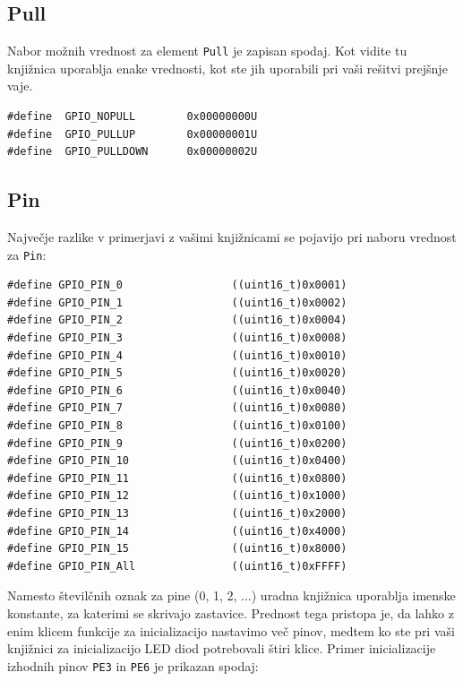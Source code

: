 \documentclass[12pt,letterpaper]{article}
\begin{document}
\subsection*{Pull}

Nabor možnih vrednost za element \texttt{Pull} je zapisan spodaj. Kot vidite tu knjižnica uporablja enake vrednosti, kot ste jih uporabili pri vaši rešitvi prejšnje vaje.

\begin{center}
\begin{lstlisting}[style=CStyle]
#define  GPIO_NOPULL        0x00000000U
#define  GPIO_PULLUP        0x00000001U
#define  GPIO_PULLDOWN      0x00000002U
\end{lstlisting}
\end{center}


\subsection*{Pin}

Največje razlike v primerjavi z vašimi knjižnicami se pojavijo pri naboru vrednost za \texttt{Pin}:

\begin{center}
\begin{lstlisting}[style=CStyle]
#define GPIO_PIN_0                 ((uint16_t)0x0001)
#define GPIO_PIN_1                 ((uint16_t)0x0002)
#define GPIO_PIN_2                 ((uint16_t)0x0004)
#define GPIO_PIN_3                 ((uint16_t)0x0008)
#define GPIO_PIN_4                 ((uint16_t)0x0010)
#define GPIO_PIN_5                 ((uint16_t)0x0020)
#define GPIO_PIN_6                 ((uint16_t)0x0040)
#define GPIO_PIN_7                 ((uint16_t)0x0080)
#define GPIO_PIN_8                 ((uint16_t)0x0100)
#define GPIO_PIN_9                 ((uint16_t)0x0200)
#define GPIO_PIN_10                ((uint16_t)0x0400)
#define GPIO_PIN_11                ((uint16_t)0x0800)
#define GPIO_PIN_12                ((uint16_t)0x1000)
#define GPIO_PIN_13                ((uint16_t)0x2000)
#define GPIO_PIN_14                ((uint16_t)0x4000)
#define GPIO_PIN_15                ((uint16_t)0x8000)
#define GPIO_PIN_All               ((uint16_t)0xFFFF)
\end{lstlisting}
\end{center}

Namesto številčnih oznak za pine (0, 1, 2, ...) uradna knjižnica uporablja imenske konstante, za katerimi se skrivajo zastavice. Prednost tega pristopa je, da lahko z enim klicem funkcije za inicializacijo nastavimo več pinov, medtem ko ste pri vaši knjižnici za inicializacijo LED diod potrebovali štiri klice. Primer inicializacije izhodnih pinov \texttt{PE3} in \texttt{PE6} je prikazan spodaj:
\end{document}
